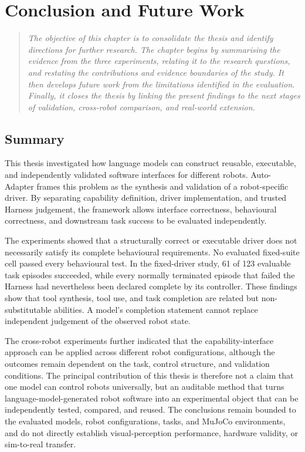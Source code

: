 \chapter[Conclusion and Future Work]{Conclusion and Future Work}\label{chapter:runtime-improvement}\label{chapter:discussion}\label{chapter:conclusion}

\begin{quote}\itshape
The objective of this chapter is to consolidate the thesis and identify
directions for further research. The chapter begins by summarising the evidence
from the three experiments, relating it to the research questions, and
restating the contributions and evidence boundaries of the study. It then
develops future work from the limitations identified in the evaluation.
Finally, it closes the thesis by linking the present findings to the next
stages of validation, cross-robot comparison, and real-world extension.
\end{quote}

\section[Summary]{Summary}

This thesis investigated how language models can construct reusable,
executable, and independently validated software interfaces for different
robots. Auto-Adapter frames this problem as the synthesis and validation of a
robot-specific driver. By separating capability definition, driver
implementation, and trusted Harness judgement, the framework allows interface
correctness, behavioural correctness, and downstream task success to be
evaluated independently.

The experiments showed that a structurally correct or executable driver does
not necessarily satisfy its complete behavioural requirements. No evaluated
fixed-suite cell passed every behavioural test. In the fixed-driver study, 61
of 123 evaluable task episodes succeeded, while every normally terminated
episode that failed the Harness had nevertheless been declared complete by its
controller. These findings show that tool synthesis, tool use, and task
completion are related but non-substitutable abilities. A model's completion
statement cannot replace independent judgement of the observed robot state.

The cross-robot experiments further indicated that the capability-interface
approach can be applied across different robot configurations, although the
outcomes remain dependent on the task, control structure, and validation
conditions. The principal contribution of this thesis is therefore not a claim
that one model can control robots universally, but an auditable method that
turns language-model-generated robot software into an experimental object that
can be independently tested, compared, and reused. The conclusions remain
bounded to the evaluated models, robot configurations, tasks, and MuJoCo
environments, and do not directly establish visual-perception performance,
hardware validity, or sim-to-real transfer.

